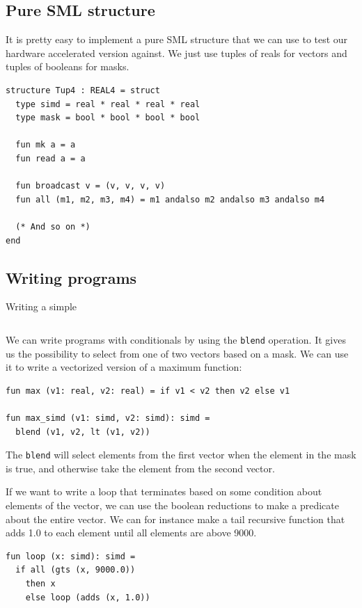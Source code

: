 \documentclass{article}
\begin{document}
\subsection{Pure SML structure}

It is pretty easy to implement a pure SML structure that we can use to test our hardware accelerated version against. We just use tuples of reals for vectors and tuples of booleans for masks.
\begin{lstlisting}[frame=single, label={lst:tup4}, caption={Implementation of \texttt{REAL4} using tuples}]
structure Tup4 : REAL4 = struct
  type simd = real * real * real * real
  type mask = bool * bool * bool * bool

  fun mk a = a
  fun read a = a

  fun broadcast v = (v, v, v, v)
  fun all (m1, m2, m3, m4) = m1 andalso m2 andalso m3 andalso m4

  (* And so on *)
end
\end{lstlisting}

\subsection{Writing programs}

Writing a simple 

\begin{lstlisting}[frame=single, label={lst:numeric}, caption={Numeric program}]
\end{lstlisting}
We can write programs with conditionals by using the \texttt{blend} operation. It gives us the possibility to select from one of two vectors based on a mask. We can use it to write a vectorized version of a maximum function:
\begin{lstlisting}[frame=single, label={lst:max}, caption={Max function}]
fun max (v1: real, v2: real) = if v1 < v2 then v2 else v1

fun max_simd (v1: simd, v2: simd): simd =
  blend (v1, v2, lt (v1, v2))
\end{lstlisting}
The \texttt{blend} will select elements from the first vector when the element in the mask is true, and otherwise take the element from the second vector.

If we want to write a loop that terminates based on some condition about elements of the vector, we can use the boolean reductions to make a predicate about the entire vector.
We can for instance make a tail recursive function that adds 1.0 to each element until all elements are above 9000.
\begin{lstlisting}[frame=single, label={lst:max}, caption={Iteration with guard}]
fun loop (x: simd): simd =
  if all (gts (x, 9000.0))
    then x
    else loop (adds (x, 1.0))
\end{lstlisting}
\end{document}

